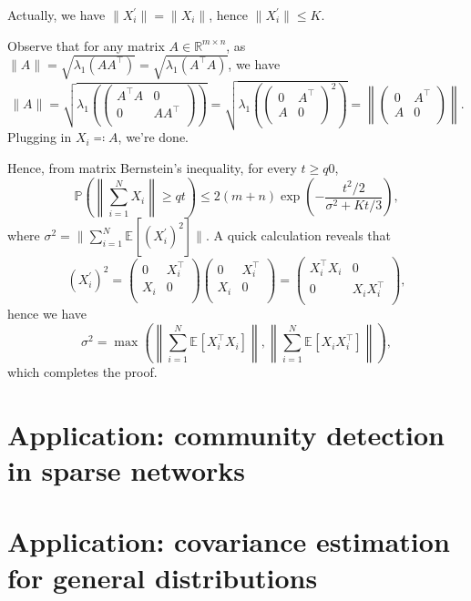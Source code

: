 \begin{answer}
	\begin{claim}
		Actually, we have \(\lVert X_i^{\prime} \rVert = \lVert X_i \rVert \), hence \(\lVert X_i^{\prime} \rVert \leq K\).
	\end{claim}
	\begin{explanation}
		Observe that for any matrix \(A \in \mathbb{R} ^{m \times n}\), as \(\lVert A \rVert = \sqrt{\lambda _1 (A A^{\top} )} = \sqrt{\lambda _1(A ^{\top} A)} \), we have
		\[
			\lVert A \rVert
			= \sqrt{\lambda _1 \left( \begin{pmatrix}
					A^{\top} A & 0          \\
					0          & A A^{\top} \\
				\end{pmatrix} \right) }
			= \sqrt{\lambda _1 \left( \begin{pmatrix}
					0 & A^{\top} \\
					A & 0        \\
				\end{pmatrix}^2 \right) }
			= \left\lVert \begin{pmatrix}
				0 & A^{\top} \\
				A & 0        \\
			\end{pmatrix} \right\rVert.
		\]
		Plugging in \(X_i \eqqcolon A\), we're done.
	\end{explanation}

	Hence, from matrix Bernstein's inequality, for every \(t \geq q 0\),
	\[
		\mathbb{P} \left( \left\lVert \sum_{i=1}^{N} X_i \right\rVert \geq q t \right)
		\leq 2 (m+n) \exp (- \frac{t^2 / 2}{\sigma ^2 + Kt / 3}),
	\]
	where \(\sigma ^2 = \lVert \sum_{i=1}^{N} \mathbb{E}_{}[(X_i ^{\prime}) ^2] \rVert \). A quick calculation reveals that
	\[
		(X_i^{\prime} )^2
		= \begin{pmatrix}
			0   & X_i ^{\top} \\
			X_i & 0           \\
		\end{pmatrix}\begin{pmatrix}
			0   & X_i ^{\top} \\
			X_i & 0           \\
		\end{pmatrix}
		= \begin{pmatrix}
			X_i ^{\top} X_i & 0               \\
			0               & X_i X_i ^{\top} \\
		\end{pmatrix},
	\]
	hence we have
	\[
		\sigma ^2
		= \max \left( \left\lVert \sum_{i=1}^{N} \mathbb{E}_{}[X_i ^{\top} X_i] \right\rVert , \left\lVert \sum_{i=1}^{N} \mathbb{E}_{}[X_i X_i ^{\top} ] \right\rVert \right),
	\]
	which completes the proof.
\end{answer}

\section{Application: community detection in sparse networks}


\section{Application: covariance estimation for general distributions}